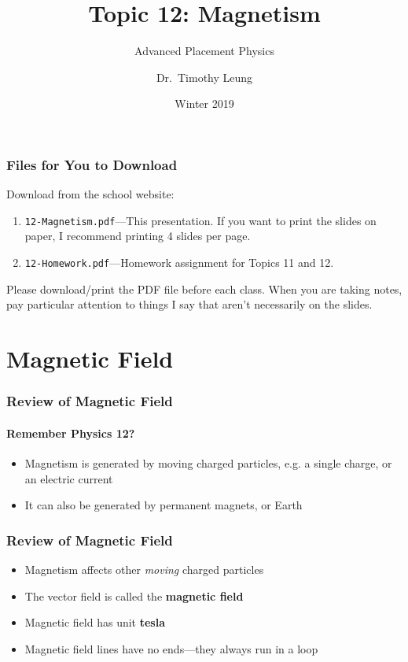 \documentclass[12pt,aspectratio=169]{beamer}
\title{Topic 12: Magnetism}
\subtitle{Advanced Placement Physics}
\author[TML]{Dr.\ Timothy Leung}
\institute{Olympiads School}
\date{Winter 2019}
\begin{document}
\begin{frame}
  \maketitle
\end{frame}



\begin{frame}
  \frametitle{Files for You to Download}
  Download from the school website:
  \begin{enumerate}
  \item\texttt{12-Magnetism.pdf}---This presentation. If you want to print the
    slides on paper, I recommend printing 4 slides per page.
  \item\texttt{12-Homework.pdf}---Homework assignment for Topics 11 and 12.
  \end{enumerate}

  \vspace{.2in}Please download/print the PDF file before each class. When you
  are taking notes, pay particular attention to things I say that aren't
  necessarily on the slides.
\end{frame}



\section{Magnetic Field}

\begin{frame}
  \frametitle{Review of Magnetic Field}
  \framesubtitle{Remember Physics 12?}
  \begin{itemize}
  \item Magnetism is generated by moving charged particles, e.g.
    a single charge, or an electric current
  \item It can also be generated by permanent magnets, or Earth
  \end{itemize}
\end{frame}

\begin{frame}
  \frametitle{Review of Magnetic Field}
  \begin{itemize}
  \item Magnetism affects other \emph{moving} charged particles
  \item The vector field is called the \textbf{magnetic field}
  \item Magnetic field has unit \textbf{tesla}
  \item Magnetic field lines have no ends---they always run in a loop
  \end{itemize}
\end{frame}
\end{document}
